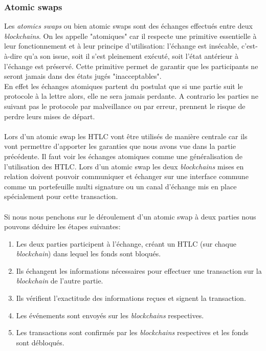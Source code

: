 \subsubsection{Atomic swaps}
Les \textit{atomics swaps} ou bien \glspl{atomic swap} sont des échanges effectués entre deux \textit{\gls{blockchain}s}\cite{herlihy2018atomic}. On les appelle "atomiques" car il respecte une primitive essentielle à leur fonctionnement et à leur principe d'utilisation: 
l'échange est insécable, c'est-à-dire qu'a son issue, soit il s'est pleinement exécuté, soit l'état antérieur à l'échange est préservé.
Cette primitive permet de garantir que les participants ne seront jamais dans des états jugés "inacceptables". \\
En effet les échanges atomiques partent du postulat que si une partie suit le protocole à la lettre alors, 
elle ne sera jamais perdante. A contrario les parties ne suivant pas le protocole par malveillance ou par erreur, prennent le risque de perdre leurs mises de départ.\\ \\
Lors d'un \gls{atomic swap} les HTLC vont être utilisés de manière centrale car ils vont permettre d'apporter les garanties que nous avons vue dans la partie précédente. Il faut voir les échanges atomiques comme une généralisation de l'utilisation des HTLC. Lors d'un \gls{atomic swap} les deux \textit{\gls{blockchain}s} mises en relation doivent pouvoir communiquer et échanger sur une interface commune comme un portefeuille multi signature ou un canal d'échange mis en place spécialement pour cette transaction. \\ \\
Si nous nous penchons sur le déroulement d'un \gls{atomic swap} à deux parties nous pouvons déduire les étapes suivantes: 
\begin{enumerate}
    \item Les deux parties participent à l'échange, créant un HTLC (sur chaque \textit{\gls{blockchain}}) dans lequel les fonds sont bloqués. 
    \item Ils échangent les informations nécessaires pour effectuer une transaction sur la \textit{\gls{blockchain}} de l'autre partie. 
    \item Ils vérifient l'exactitude des informations reçues et signent la transaction. 
    \item Les événements sont envoyés sur les \textit{\gls{blockchain}s} respectives. 
    \item Les transactions sont confirmés par les \textit{\gls{blockchain}s} respectives et les fonds sont débloqués.
\end{enumerate}

